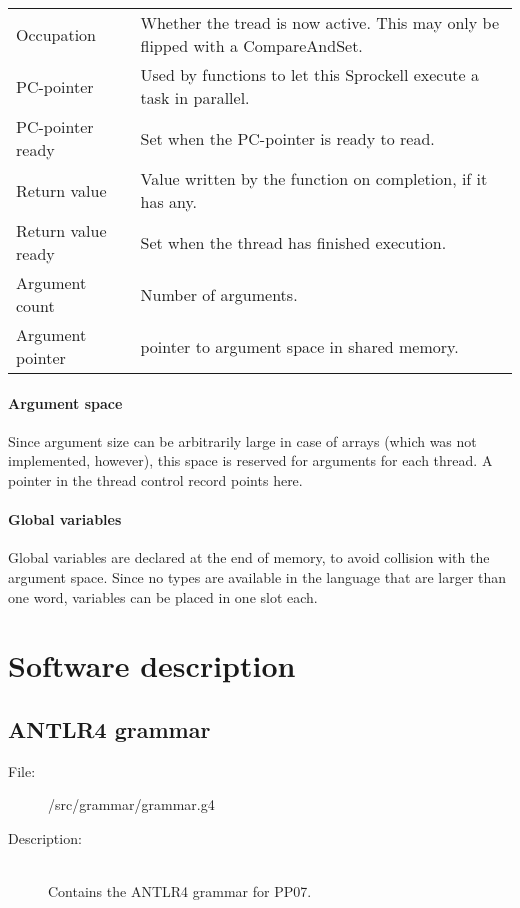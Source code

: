 \documentclass[10pt,a4paper]{report}
\begin{document}
\begin{tabular}{| l | l |}
\hline
Occupation 
	& Whether the tread is now active. This may only be flipped with a CompareAndSet. \\
PC-pointer 
	& Used by functions to let this Sprockell execute a task in parallel. \\
PC-pointer ready 
	& Set when the PC-pointer is ready to read. \\
Return value 
	& Value written by the function on completion, if it has any. \\
Return value ready 
	& Set when the thread has finished execution. \\
Argument count 
	& Number of arguments. \\
Argument pointer 
	& pointer to argument space in shared memory. \\ 
\hline
\end{tabular}

\subsubsection{Argument space}
Since argument size can be arbitrarily large in case of arrays (which was not implemented, however), this space is reserved for arguments for each thread. A pointer in the thread control record points here.
       
\subsubsection{Global variables}
Global variables are declared at the end of memory, to avoid collision with the argument space. Since no types are available in the language that are larger than one word, variables can be placed in one slot each.


\chapter{Software description}


\section{ANTLR4 grammar}

\begin{description}
	\item[File:] /src/grammar/grammar.g4
	\item[Description:] \hfill \\
		Contains the ANTLR4 grammar for PP07.
\end{description}
\end{document}
